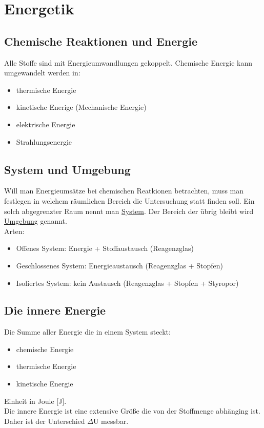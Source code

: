 
\section{Energetik} \label{sec:energetik}


\subsection{Chemische Reaktionen und Energie}
Alle Stoffe sind mit Energieumwandlungen gekoppelt.
Chemische Energie kann umgewandelt werden in:
\begin{itemize}
    \item thermische Energie
    \item kinetische Enerige (Mechanische Energie)
    \item elektrische Energie
    \item Strahlungsenergie
\end{itemize}


\subsection{System und Umgebung}
Will man Energieumsätze bei chemischen Reatkionen betrachten, muss man festlegen in welchem räumlichen Bereich die Untersuchung statt finden soll.
Ein solch abgegrenzter Raum nennt man \underline{System}. Der Bereich der übrig bleibt wird \underline{Umgebung} genannt. \\
Arten:
\begin{itemize}
    \item Offenes System: 
        Energie + Stoffaustausch (Reagenzglas)
    \item Geschlossenes System:
        Energieaustausch (Reagenzglas + Stopfen)
    \item Isoliertes System: 
        kein Austausch  (Reagenzglas + Stopfen + Styropor)
\end{itemize}


\subsection{Die innere Energie}
Die Summe aller Energie die in einem System steckt:
\begin{itemize}
    \item chemische Energie
    \item thermische Energie
    \item kinetische Energie
\end{itemize}
Einheit in Joule [J].\\
Die innere Energie ist eine extensive Größe die von der Stoffmenge abhänging ist. Daher ist der Unterschied $\Delta$U messbar.


